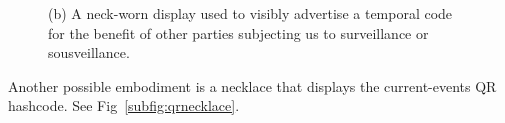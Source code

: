 \begin{figure}[t]
{           (b) A neck-worn display used to visibly advertise a temporal code
           for the benefit of other parties subjecting us to surveillance
           or sousveillance.
}
  \label{fig:wristcomp}   
\end{figure}
Another possible embodiment is a necklace that displays the current-events
QR hashcode.  See Fig~\ref{subfig:qrnecklace}.

%

